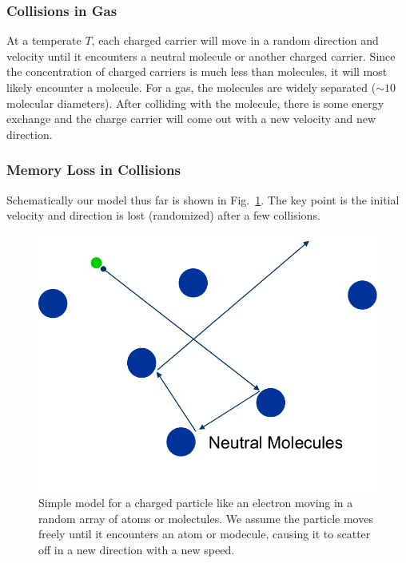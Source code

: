 \subsubsection{Collisions in Gas}
At a temperate $T$, each charged carrier will move in a random direction and velocity until it encounters a neutral molecule or another charged carrier.  Since the concentration of charged carriers is much less than molecules, it will most likely encounter a molecule. For a gas, the molecules are widely separated ($\sim 10$ molecular diameters).  After colliding with the molecule, there is some energy exchange and the charge carrier will come out with a new velocity and new direction.
\subsubsection{Memory Loss in Collisions}
 Schematically our model thus far is shown in Fig.~\ref{fig:slide8}.   The key point is the initial velocity and direction is lost (randomized) after a few collisions.
\begin{figure}
\begin{center}
\includegraphics[width=.4\columnwidth]{slide8}
\end{center}
\caption{Simple model for a charged particle like an electron moving in a random array of atoms or molectules.  We assume the particle moves freely until it encounters an atom or modecule, causing it to scatter off in a new direction with a new speed. }
\label{fig:slide8}
\end{figure}
